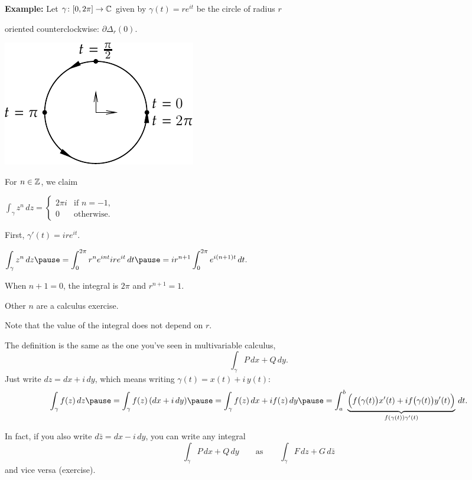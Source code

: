 \documentclass[10pt,aspectratio=169]{beamer}
\begin{document}
\begin{frame}
\textbf{Example:}
Let $\gamma \colon [0,2\pi] \to {\mathbb{C}}$ given by $\gamma(t) = r e^{it}$ be
the circle of radius $r$

oriented counterclockwise: $\partial \Delta_r(0)$.

\hspace{3in}%
\includegraphics{../figures/circlepath}

\vspace*{-1.3in}
\pause
For $n \in {\mathbb{Z}}$, we claim

\medskip
\qquad
$\displaystyle
\int_\gamma z^n \, dz
=
\begin{cases}
2\pi i & \text{if } n=-1, \\
0 & \text{otherwise.}
\end{cases}
$

\pause
\medskip

First, $\gamma'(t) = i r e^{it}$.

\pause
\medskip

\qquad
$\displaystyle
\int_\gamma z^n \, dz
\pause
=
\int_0^{2\pi}
r^n
e^{int} i r e^{it} \, dt
\pause
=
i r^{n+1}
\int_0^{2\pi}
e^{i(n+1)t} \, dt .
$

\pause
\medskip

When $n+1=0$, the integral is $2\pi$ and $r^{n+1}=1$.

\medskip
\pause

Other $n$ are a calculus exercise.

\medskip
\pause

Note that the value of the integral does not depend on $r$.
\end{frame}

\begin{frame}
The definition is the same as the one you've seen in multivariable calculus,
\[
\int_\gamma P \, dx + Q \, dy .
\]
\medskip
\pause
Just write $dz = dx + i \, dy$, which means writing
$\gamma(t) = x(t) + i\, y(t)$:
\[
\int_{\gamma} f(z) \, dz
\pause
=
\int_{\gamma} f(z) \, (dx + i\, dy)
\pause
=
\int_{\gamma} f(z) \, dx + i f(z) \, dy
\pause
=
\int_a^b \underbrace{\Bigl( f\bigl(\gamma(t)\bigr) x'(t) + i f\bigl(\gamma(t)\bigr) y'(t) \Bigr)}_{f(\gamma(t)) \gamma'(t)} \, dt .
\]
\medskip
\pause

In fact, if you also write $d\bar{z} = dx - i \, dy$, you can write any
integral
\[
\int_{\gamma} P \, dx + Q \, dy
\qquad \text{as} \qquad
\int_{\gamma} F \, dz + G \, d\bar{z}
\]
and vice versa (exercise).
\end{frame}
\end{document}
